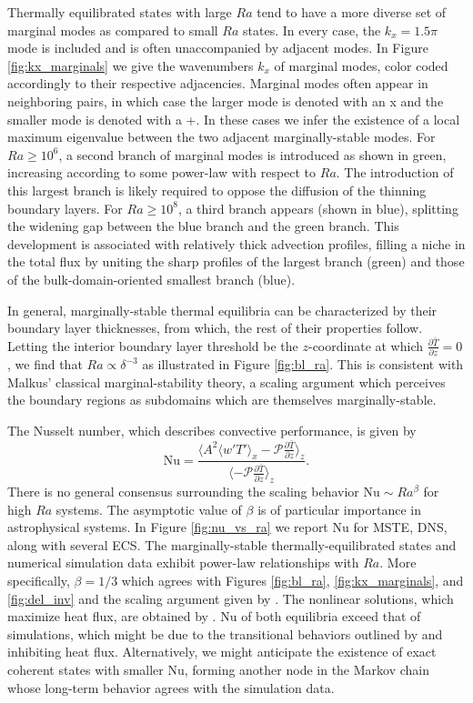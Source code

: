 \documentclass[reprint,amsmath,amssymb,aps]{revtex4-1}
\newcommand\Nu{\mathrm{Nu}}
\begin{document}
Thermally equilibrated states with large $Ra$ tend to have a more diverse set of marginal modes as compared to small $Ra$ states. 
In every case, the $k_x = 1.5\pi$ mode is included and is often unaccompanied by adjacent modes. 
In Figure \ref{fig:kx_marginals} we give the wavenumbers $k_x$ of marginal modes, color coded accordingly to their respective adjacencies. 
Marginal modes often appear in neighboring pairs, in which case the larger mode is denoted with an x and the smaller mode is denoted with a +. 
In these cases we infer the existence of a local maximum eigenvalue between the two adjacent marginally-stable modes. 
For $Ra \geq 10^6$, a second branch of marginal modes is introduced as shown in green, increasing according to some power-law with respect to $Ra$. 
The introduction of this largest branch is likely required to oppose the diffusion of the thinning boundary layers. 
For $Ra \geq 10^8$, a third branch appears (shown in blue), splitting the widening gap between the blue branch and the green branch. 
This development is associated with relatively thick advection profiles, filling a niche in the total flux by uniting the sharp profiles of the largest branch (green) and those of the bulk-domain-oriented smallest branch (blue).

In general, marginally-stable thermal equilibria can be characterized by their boundary layer thicknesses, from which, the rest of their properties follow. Letting the interior boundary layer threshold be the $z$-coordinate at which $\frac{\partial \bar{T}}{\partial z} = 0$, we find that $Ra \propto  \delta^{-3}$ as illustrated in Figure \ref{fig:bl_ra}. 
This is consistent with Malkus' classical marginal-stability theory, a scaling argument which perceives the boundary regions as subdomains which are themselves marginally-stable.

The Nusselt number, which describes convective performance, is given by
\begin{equation}
  \Nu = \frac{\langle A^2 \langle w'T' \rangle_x - \mathcal{P}\frac{\partial \bar{T}}{\partial z} \rangle_z}{\langle- \mathcal{P}\frac{\partial \bar{T}}{\partial z} \rangle_z}.
\end{equation}
There is no general consensus surrounding the scaling behavior $\Nu \sim Ra^{\beta}$ for high $Ra$ systems. The asymptotic value of $\beta$ is of particular importance in astrophysical systems. In Figure \ref{fig:nu_vs_ra} we report $\Nu$ for MSTE, DNS, along with several ECS. 
The marginally-stable thermally-equilibrated states and numerical simulation data exhibit power-law relationships with $Ra$. 
More specifically, $\beta = 1/3$ which agrees with Figures \ref{fig:bl_ra}, \ref{fig:kx_marginals}, and \ref{fig:del_inv} and the scaling argument given by \cite{Malkus_1954}. 
The nonlinear solutions, which maximize heat flux, are obtained by \cite{Waleffe}. 
$\Nu$ of both equilibria exceed that of simulations, which might be due to the transitional behaviors outlined by \cite{Yalniz} and \cite{Cvitanovic} inhibiting heat flux. 
Alternatively, we might anticipate the existence of exact coherent states with smaller $\Nu$, forming another node in the Markov chain whose long-term behavior agrees with the simulation data.
\end{document}
